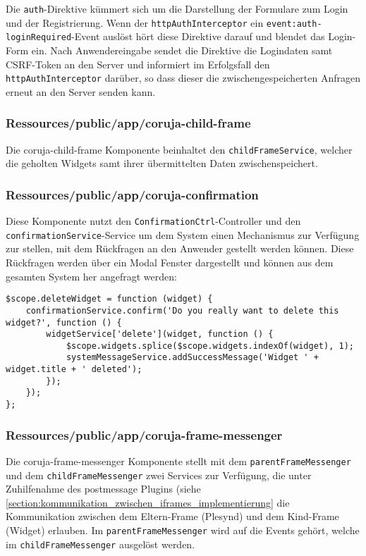 Die \texttt{auth}-Direktive kümmert sich um die Darstellung der Formulare zum Login und der Registrierung. Wenn der \texttt{httpAuthInterceptor} ein \texttt{event:auth-loginRequired}-Event auslöst hört diese Direktive darauf und blendet das Login-Form ein. Nach Anwendereingabe sendet die Direktive die Logindaten samt CSRF-Token an den Server und informiert im Erfolgsfall den \texttt{httpAuthInterceptor} darüber, so dass dieser die zwischengespeicherten Anfragen erneut an den Server senden kann.

\subsubsection*{Ressources/public/app/coruja-child-frame}
Die coruja-child-frame Komponente beinhaltet den \texttt{childFrameService}, welcher die geholten Widgets samt ihrer übermittelten Daten zwischenspeichert.

\subsubsection*{Ressources/public/app/coruja-confirmation}
Diese Komponente nutzt den \texttt{ConfirmationCtrl}-Controller und den \texttt{confirmationService}-Service um dem System einen Mechanismus zur Verfügung zur stellen, mit dem Rückfragen an den Anwender gestellt werden können. Diese Rückfragen werden über ein Modal Fenster dargestellt und können aus dem gesamten System her angefragt werden:
\begin{lstlisting}[caption=Rückfrage an den Anwender bei Löschen eines Widgets, label=listing:confirmation_and_message]
$scope.deleteWidget = function (widget) {
    confirmationService.confirm('Do you really want to delete this widget?', function () {
        widgetService['delete'](widget, function () {
            $scope.widgets.splice($scope.widgets.indexOf(widget), 1);
            systemMessageService.addSuccessMessage('Widget ' + widget.title + ' deleted');
        });
    });
};
\end{lstlisting}

\subsubsection*{Ressources/public/app/coruja-frame-messenger}
Die coruja-frame-messenger Komponente stellt mit dem \texttt{parentFrameMessenger} und dem \texttt{childFrameMessenger} zwei Services zur Verfügung, die unter Zuhilfenahme des postmessage Plugins (siehe \ref{section:kommunikation_zwischen_iframes_implementierung} die Kommunikation zwischen dem Eltern-Frame (Plesynd) und dem Kind-Frame (Widget) erlauben. Im \texttt{parentFrameMessenger} wird auf die Events gehört, welche im \texttt{childFrameMessenger} ausgelöst werden.

